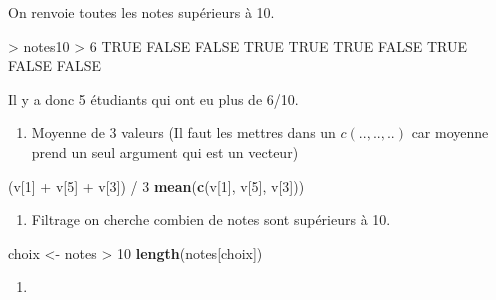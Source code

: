 \documentclass[
]{article}
\newenvironment{Shaded}{}{}
\newcommand{\DecValTok}[1]{\textcolor[rgb]{0.25,0.63,0.44}{#1}}
\newcommand{\KeywordTok}[1]{\textcolor[rgb]{0.00,0.44,0.13}{\textbf{#1}}}
\newcommand{\NormalTok}[1]{#1}
\newcommand{\OperatorTok}[1]{\textcolor[rgb]{0.40,0.40,0.40}{#1}}
\newcommand{\OtherTok}[1]{\textcolor[rgb]{0.00,0.44,0.13}{#1}}
\newcommand{\StringTok}[1]{\textcolor[rgb]{0.25,0.44,0.63}{#1}}
\providecommand{\tightlist}{%
  \setlength{\itemsep}{0pt}\setlength{\parskip}{0pt}}
\begin{document}
On renvoie toutes les notes supérieurs à 10.

\begin{Shaded}
\begin{Highlighting}[]
 \OperatorTok{\textgreater{}}\StringTok{ }\NormalTok{notes10 }\OperatorTok{\textgreater{}}\StringTok{ }\DecValTok{6}  
\OtherTok{TRUE} \OtherTok{FALSE} \OtherTok{FALSE}  \OtherTok{TRUE}  \OtherTok{TRUE}  \OtherTok{TRUE} \OtherTok{FALSE}  \OtherTok{TRUE} \OtherTok{FALSE} \OtherTok{FALSE}
\end{Highlighting}
\end{Shaded}

Il y a donc 5 étudiants qui ont eu plus de 6/10.

\begin{enumerate}
\def\labelenumi{\arabic{enumi}.}
\setcounter{enumi}{4}
\tightlist
\item
  Moyenne de 3 valeurs (Il faut les mettres dans un \(c(..,..,..)\) car
  moyenne prend un seul argument qui est un vecteur)
\end{enumerate}

\begin{Shaded}
\begin{Highlighting}[]
\NormalTok{(v[}\DecValTok{1}\NormalTok{] }\OperatorTok{+}\StringTok{ }\NormalTok{v[}\DecValTok{5}\NormalTok{] }\OperatorTok{+}\StringTok{ }\NormalTok{v[}\DecValTok{3}\NormalTok{]) }\OperatorTok{/}\StringTok{ }\DecValTok{3}  
\KeywordTok{mean}\NormalTok{(}\KeywordTok{c}\NormalTok{(v[}\DecValTok{1}\NormalTok{], v[}\DecValTok{5}\NormalTok{], v[}\DecValTok{3}\NormalTok{]))}
\end{Highlighting}
\end{Shaded}

\begin{enumerate}
\def\labelenumi{\arabic{enumi}.}
\setcounter{enumi}{5}
\tightlist
\item
  Filtrage on cherche combien de notes sont supérieurs à 10.
\end{enumerate}

\begin{Shaded}
\begin{Highlighting}[]
\NormalTok{choix \textless{}{-}}\StringTok{ }\NormalTok{notes }\OperatorTok{\textgreater{}}\StringTok{ }\DecValTok{10}  
\KeywordTok{length}\NormalTok{(notes[choix])}
\end{Highlighting}
\end{Shaded}

\begin{enumerate}
\def\labelenumi{\arabic{enumi}.}
\setcounter{enumi}{6}
\tightlist
\item
\end{enumerate}
\end{document}
